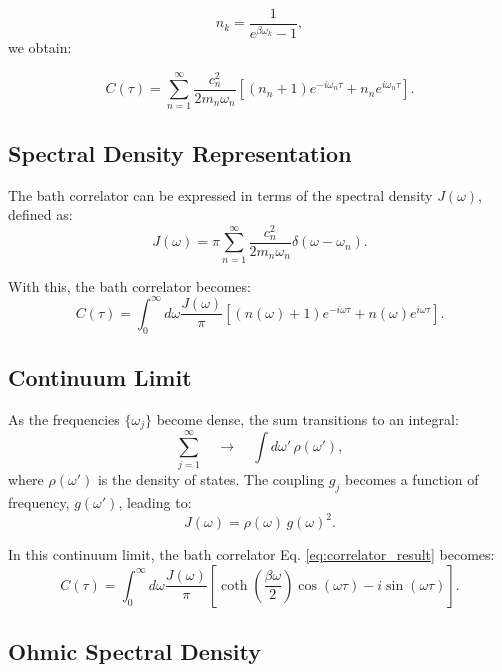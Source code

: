 \begin{equation} \label{eq:bose_einstein_distribution}
	n_k = \frac{1}{e^{\beta \omega_k} - 1},
\end{equation}
we obtain:

\begin{equation} \label{eq:correlator_result}
	C(\tau) = \sum_{n=1}^{\infty} \frac{c_n^2}{2 m_n \omega_n} \left[ (n_n + 1) e^{-i \omega_n \tau} + n_n e^{i \omega_n \tau} \right].
\end{equation}

\subsection{Spectral Density Representation}
\label{subsec:spectral_density}

The bath correlator can be expressed in terms of the spectral density \( J(\omega) \), defined as:
\begin{equation} \label{eq:bath_spectral_density}
	J(\omega) = \pi \sum_{n=1}^{\infty} \frac{c_n^2}{2 m_n \omega_n} \delta(\omega - \omega_n).
\end{equation}

With this, the bath correlator becomes:
\begin{equation} \label{eq:correlator_spectral_density}
	C(\tau) = \int_0^\infty d\omega \frac{J(\omega)}{\pi} \left[ (n(\omega) + 1) e^{-i \omega \tau} + n(\omega) e^{i \omega \tau} \right].
\end{equation}

\subsection{Continuum Limit}
As the frequencies \( \{\omega_j\} \) become dense, the sum transitions to an integral:
\[
	\sum_{j=1}^{\infty} \quad \longrightarrow \quad \int d\omega'\,\rho(\omega'),
\]
where \( \rho(\omega') \) is the density of states. The coupling \( g_j \) becomes a function of frequency, \( g(\omega') \), leading to:
\[
	J(\omega) = \rho(\omega)\,g(\omega)^2.
\]

In this continuum limit, the bath correlator Eq. \eqref{eq:correlator_result} becomes:
\begin{equation} \label{eq:correlator_final}
	C(\tau) = \int_0^\infty d\omega \frac{J(\omega)}{\pi} \left[ \coth\left( \frac{\beta \omega}{2} \right) \cos(\omega \tau) - i \sin(\omega \tau) \right].
\end{equation}

\subsection{Ohmic Spectral Density}
\label{subsec:ohmic_spectral_density}

